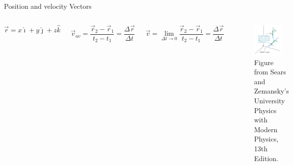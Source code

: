 \documentclass[]{beamer}
\begin{document}

\begin{frame}
    Position and velocity Vectors
    \vspace{3mm}
 
    \begin{columns}[c]
        \column{2in}  %
       
        \begin{equation}
          \vec{r}=x\hat{\imath}+y\hat{\jmath}+z\hat{k}
         \end{equation}
         \vspace{3mm}
      

        \begin{equation}
            \vec{v}_{av}=\frac{\vec{r}_2-\vec{r}_1}{t_2-t_1}=\frac{\Delta \vec{r}}{\Delta{t}}
        \end{equation}
     
        \vspace{3mm}
     
        
       \begin{equation}
           \vec{v}=\lim_{\Delta t\to 0}\frac{\vec{r}_2-\vec{r}_1}{t_2-t_1}=\frac{\Delta \vec{r}}{\Delta{t}}
       \end{equation}
    
        \column{2.5in}
        
        \begin{figure}[h!]  
       \includegraphics[width=0.8\textwidth]{images/9.jpg}
        \caption{ {\tiny Figure from Sears and Zemansky's University Physics 
        with Modern Physics, 13th Edition.} }
     \end{figure}
     
     
     
        \end{columns}
    
\end{frame}
\end{document}
